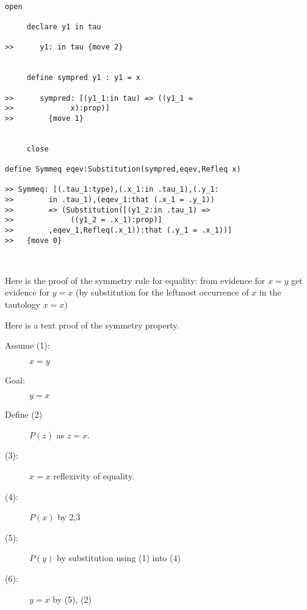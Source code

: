 \documentclass[12pt]{article}
\begin{document}
\begin{verbatim}

open

     declare y1 in tau

>>      y1: in tau {move 2}


     define sympred y1 : y1 = x

>>      sympred: [(y1_1:in tau) => ((y1_1 = 
>>             x):prop)]
>>        {move 1}


     close

define Symmeq eqev:Substitution(sympred,eqev,Refleq x)

>> Symmeq: [(.tau_1:type),(.x_1:in .tau_1),(.y_1:
>>        in .tau_1),(eqev_1:that (.x_1 = .y_1)) 
>>        => (Substitution([(y1_2:in .tau_1) => 
>>             ((y1_2 = .x_1):prop)]
>>        ,eqev_1,Refleq(.x_1)):that (.y_1 = .x_1))]
>>   {move 0}



\end{verbatim}

Here is the proof of the symmetry rule for equality:  from evidence for $x=y$ get evidence for $y=x$ (by substitution for the leftmost occurrence of $x$ in the tautology $x=x$)

Here is a text proof of the symmetry property.

\begin{description}

\item [Assume (1):]  $x=y$

\item[Goal:]  $y=x$

\item[Define (2)] $P(z)$ as $z=x$.

\item[(3):]  $x=x$  reflexivity of equality.

\item[(4):]  $P(x)$ by 2,3

\item[(5):]  $P(y)$ by substitution using (1) into (4)

\item[(6):]  $y=x$ by (5), (2)

\end{description}
\end{document}
